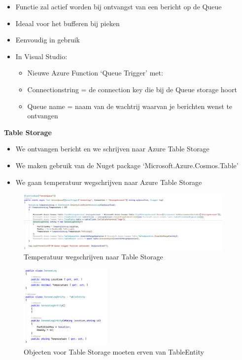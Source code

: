 \documentclass{article}
\newcommand{\bold}[1]{\textbf{#1}}
\begin{document}
\begin{itemize}
    \item Functie zal actief worden bij ontvangst van een bericht op de Queue
    \item Ideaal voor het bufferen bij pieken
    \item Eenvoudig in gebruik
    \item In Visual Studio: 
    \begin{itemize}
        \item Nieuwe Azure Function `Queue Trigger' met:
        \item Connectionstring = de connection key die bij de Queue storage hoort
        \item Queue name = naam van de wachtrij waarvan je berichten wenst te ontvangen
    \end{itemize}
\end{itemize}

\bold{Table Storage}

\begin{itemize}
    \item We ontvangen bericht en we schrijven naar Azure Table Storage
    \item We maken gebruik van de Nuget package `Microsoft.Azure.Cosmos.Table'
    \item We gaan temperatuur wegschrijven naar Azure Table Storage
\end{itemize}

\begin{figure}[H]
    \centering
    \includegraphics[width=0.95\textwidth]{scenario-3-1.png}
    \caption{Temperatuur wegschrijven naar Table Storage}
\end{figure}

\begin{figure}[H]
    \centering
    \includegraphics[width=0.4\textwidth]{scenario-3-2.png}
    \caption{Objecten voor Table Storage moeten erven van TableEntity}
\end{figure}
\end{document}

